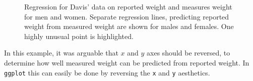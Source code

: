 \documentclass[
  letterpaper,
  10pt,
  krantz2]{krantz}
\makeatletter
\newenvironment{Shaded}{\begin{snugshade}}{\end{snugshade}}
\newcommand{\AttributeTok}[1]{\textcolor[rgb]{0.40,0.45,0.13}{#1}}
\newcommand{\ConstantTok}[1]{\textcolor[rgb]{0.56,0.35,0.01}{#1}}
\newcommand{\DecValTok}[1]{\textcolor[rgb]{0.68,0.00,0.00}{#1}}
\newcommand{\FunctionTok}[1]{\textcolor[rgb]{0.28,0.35,0.67}{#1}}
\newcommand{\NormalTok}[1]{\textcolor[rgb]{0.00,0.23,0.31}{#1}}
\newcommand{\SpecialCharTok}[1]{\textcolor[rgb]{0.37,0.37,0.37}{#1}}
\newcommand{\StringTok}[1]{\textcolor[rgb]{0.13,0.47,0.30}{#1}}
\newenvironment{kframe}{%
  \medskip{}
  \setlength{\fboxsep}{.8em}
  \def\at@end@of@kframe{}%
  \ifinner\ifhmode%
  \def\at@end@of@kframe{\end{minipage}}%
  \begin{minipage}{\columnwidth}%
  \fi\fi%
  \def\FrameCommand##1{\hskip\@totalleftmargin \hskip-\fboxsep
  \colorbox{shadecolor}{##1}\hskip-\fboxsep
      \hskip-\linewidth \hskip-\@totalleftmargin \hskip\columnwidth}%
  \MakeFramed {\advance\hsize-\width
    \@totalleftmargin\z@ \linewidth\hsize
    \@setminipage}}%
{\par\unskip\endMakeFramed%
  \at@end@of@kframe}
\renewenvironment{Shaded}{\begin{kframe}}{\end{kframe}}
\makeatother
\begin{document}
\begin{figure}[H]


\caption{\label{fig-ch02-davis-reg1}Regression for Davis' data on
reported weight and measures weight for men and women. Separate
regression lines, predicting reported weight from measured weight are
shown for males and females. One highly unusual point is highlighted.}

\end{figure}%

In this example, it was arguable that \(x\) and \(y\) axes should be
reversed, to determine how well measured weight can be predicted from
reported weight. In \texttt{ggplot} this can easily be done by reversing
the \texttt{x} and \texttt{y} aesthetics.

\begin{Shaded}
\end{Shaded}
\end{document}
